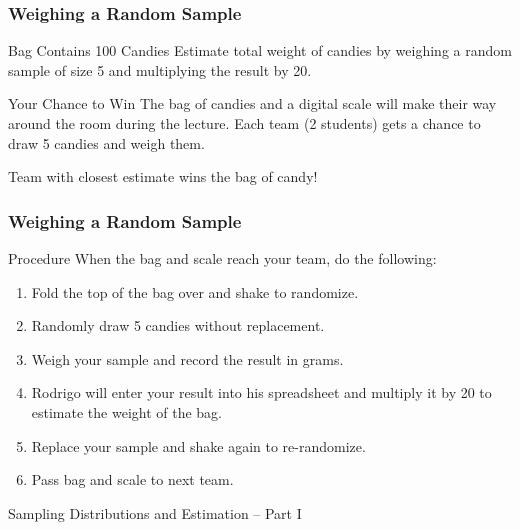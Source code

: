 \documentclass[handout]{beamer}
\date{Lecture \# 14}
\begin{document}
 


\begin{frame}[plain]
	\titlepage 
	

\end{frame} 


\begin{frame}
\frametitle{Weighing a Random Sample}
\begin{block}{Bag Contains 100 Candies}
Estimate total weight of candies by weighing a random sample of size 5 and multiplying the result by 20.
\end{block}
\begin{block}{Your Chance to Win}
The bag of candies and a digital scale will make their way around the room \alert{during the lecture}. Each team (2 students) gets a chance to draw 5 candies and weigh them.
\end{block}
\begin{alertblock}{Team with closest estimate wins the bag of candy!}
\end{alertblock}

\end{frame}
\begin{frame}
\frametitle{Weighing a Random Sample}
\begin{block}{Procedure}
When the bag and scale reach your team, do the following:
\end{block}
\begin{enumerate}
\item Fold the top of the bag over and shake to randomize.
\item Randomly draw 5 candies \alert{without replacement}.
\item Weigh your sample and record the result \alert{in grams}.
\item Rodrigo will enter your result into his spreadsheet and multiply it by 20 to estimate the weight of the bag.
\item Replace your sample and shake again to re-randomize.
\item Pass bag and scale to next team.
\end{enumerate}
\end{frame}




\begin{frame}
\begin{center}
\Huge Sampling Distributions and Estimation -- Part I
\end{center}
\end{frame}
\end{document}
